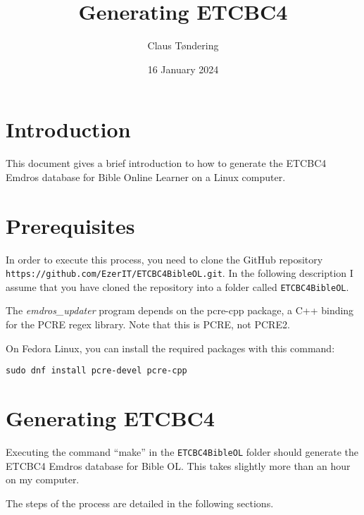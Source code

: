 \documentclass[11pt,oneside,a4paper,article]{memoir}
\title{Generating ETCBC4}
\author{Claus Tøndering}
\date{16 January 2024}
\begin{document}
\maketitle


\chapter{Introduction}

This document gives a brief introduction to how to generate the ETCBC4 Emdros database for Bible
Online Learner on a Linux computer.

\chapter{Prerequisites}

In order to execute this process, you need to clone the GitHub repository
\texttt{https://github.com/\-EzerIT/ETCBC4BibleOL.git}. In the following description I assume that you
have cloned the repository into a folder called \texttt{ETCBC4BibleOL}.

The \emph{emdros\_updater} program depends on the pcre-cpp package, a
C++ binding for the PCRE regex library. Note that this is PCRE, not
PCRE2.

On Fedora Linux, you can install the required packages with this
command:

\vspace{1ex}

\quad\texttt{sudo dnf install pcre-devel pcre-cpp}

\vspace{1ex}




\chapter{Generating ETCBC4}

Executing the command ``make'' in the \texttt{ETCBC4BibleOL} folder should generate the ETCBC4
Emdros database for Bible OL. This takes slightly more than an hour on my computer.

The steps of the process are detailed in the following sections.
\end{document}
